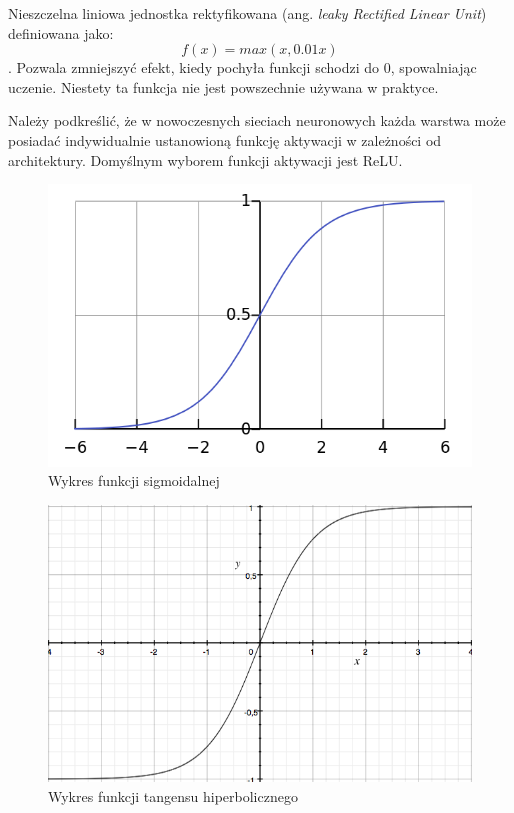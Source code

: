 \documentclass[12pt,a4paper,twoside,titlepage,openright]{book}
\begin{document}
Nieszczelna liniowa jednostka rektyfikowana (ang. \textit{leaky Rectified Linear Unit}) definiowana jako: $$f(x) = max(x, 0.01x)$$. Pozwala zmniejszyć efekt, kiedy pochyła funkcji schodzi do 0, spowalniając uczenie. Niestety ta funkcja nie jest powszechnie używana w praktyce.

Należy podkreślić, że w nowoczesnych sieciach neuronowych każda warstwa może posiadać indywidualnie ustanowioną funkcję aktywacji w zależności od architektury. Domyślnym wyborem funkcji aktywacji jest ReLU. 

\begin{figure}[ht]
	\centering
			\includegraphics[resolution=100, scale=0.7]{Sigmoid.png}
		\caption{Wykres funkcji sigmoidalnej}
\end{figure}

\begin{figure}[ht]
	\centering
			\includegraphics[resolution=100, scale=0.7]{Tangens.png}
		\caption{Wykres funkcji tangensu hiperbolicznego}
\end{figure}
\end{document}

